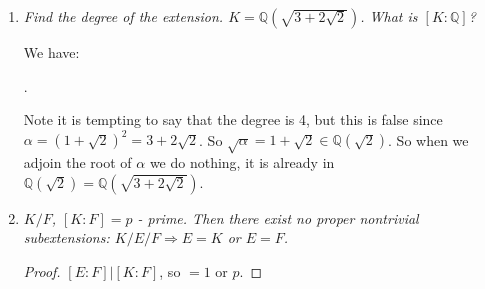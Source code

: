 \documentclass[9pt,reqno,twoside]{amsbook}
\theoremstyle{plain}
\numberwithin{section}{chapter}
\numberwithin{equation}{chapter}
\theoremstyle{definition}
\theoremstyle{remark}
\theoremstyle{plain}
\newcommand{\Q}{\mathbb{Q}}
\newcommand{\bee}{\begin{equation}\begin{aligned}}
\newcommand{\eee}{\end{aligned}\end{equation}}
\begin{document}
\begin{enumerate}[label=\arabic*.]
\begin{proof}
Assume we have the following:
\bee
\sqrt{a + \sqrt{b}} &= \sqrt{m} + \sqrt{n}\\
a + \sqrt{b} &= m + n + 2\sqrt{mn}.
\eee
Now we claim we must have $a = m + n$ and $b = 4mn$. Suppose $\sqrt{b} = c + 2\sqrt{mn}$ for some $c \in F$. Then $b = c^2 + 4c\sqrt{mn} + 4mn$. Since char$F \neq 2$, and $b \in F$, we know we must have either $\sqrt{mn} \in F$, or $c = 0$. If $\sqrt{mn} \in F$, then $\sqrt{b} \in F$, which means $b$ is a square, contradiction. So we must have $c = 0$, thus the claim holds. Then we have:
\bee
a^2 - b &= (a + \sqrt{b})(a - \sqrt{b})\\
&= (m + n + 2\sqrt{mn})(m + n - 2\sqrt{mn})\\
&= m^2 + mn - 2m\sqrt{mn} + mn + n^2 - 2n\sqrt{mn} + 2m\sqrt{mn} + 2n\sqrt{mn} - 4mn\\
&= m^2 + n^2 - 2mn\\
&= (m - n)^2.
\eee
Thus if $a^2 - b$ is a square, then we have:
\bee
\Q(\sqrt{a + \sqrt{b}}) &= \Q(\sqrt{m} + \sqrt{n}) = \Q(\sqrt{m},\sqrt{n}).
\eee
Clearly the degree is either 2 or 4, but if it is 2, then we would have $m = n$ which would give us $b$ is a square, contradiction, so the degree is 4. So $\Q(\sqrt{a + \sqrt{b}})$ is biquadratic. 
\end{proof}

\setcounter{enumi}{9}
\item \textit{Find the degree of the extension. $K = \Q(\sqrt{3 + 2 \sqrt{2}})$. What is $[K:\Q]$?}

We have:
\begin{center}
.
\end{center}
Note it is tempting to say that the degree is 4, but this is false since $\alpha = (1 + \sqrt{2})^2 = 3 + 2\sqrt{2}$. So $\sqrt{\alpha} = 1  + \sqrt{2} \in \Q(\sqrt{2})$. So when we adjoin the root of $\alpha$ we do nothing, it is already in $\Q(\sqrt{2}) = \Q(\sqrt{3 + 2 \sqrt{2}})$. 

\setcounter{enumi}{11}
\item \textit{$K/F$, $[K:F] = p$ - prime. Then there exist no proper nontrivial subextensions: 
$K/E/F \Rightarrow E = K$ or $E = F$. }

\begin{proof}
$[E:F]|[K:F]$, so $= 1$ or $p$. 
\end{proof}


\end{enumerate}
\end{document}

